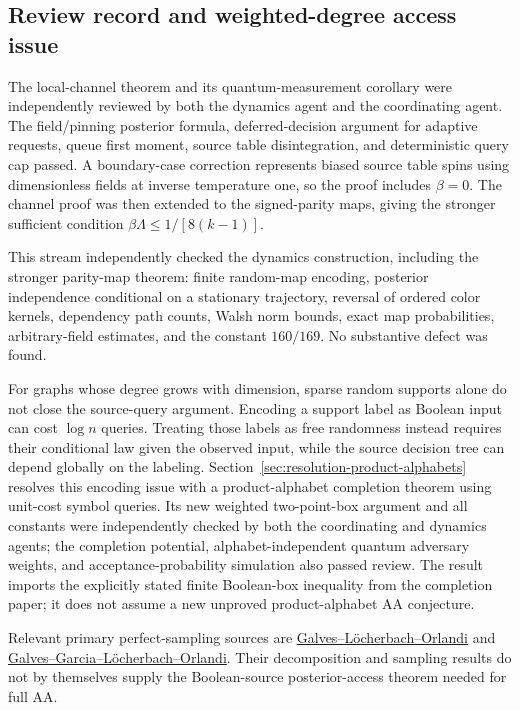\subsection{Review record and weighted-degree access issue}
\label{sec:resolution-structure-review}

The local-channel theorem and its quantum-measurement corollary were
independently reviewed by both the dynamics agent and the coordinating
agent. The field/pinning posterior formula, deferred-decision argument
for adaptive requests, queue first moment, source table disintegration,
and deterministic query cap passed. A boundary-case correction
represents biased source table spins using dimensionless fields at
inverse temperature one, so the proof includes \(\beta=0\).
The channel proof was then extended to the signed-parity maps, giving
the stronger sufficient condition \(\beta\Lambda\le1/[8(k-1)]\).

This stream independently checked the dynamics construction, including
the stronger parity-map theorem: finite random-map encoding, posterior
independence conditional on a stationary trajectory, reversal of ordered
color kernels, dependency path counts, Walsh norm bounds, exact map
probabilities, arbitrary-field estimates, and the constant \(160/169\).
No substantive defect was found.

For graphs whose degree grows with dimension, sparse random supports
alone do not close the source-query argument. Encoding a support label
as Boolean input can cost \(\log n\) queries. Treating those labels
as free randomness instead requires their conditional law given the
observed input, while the source decision tree can depend globally on
the labeling. Section~\ref{sec:resolution-product-alphabets} resolves
this encoding issue with a product-alphabet completion theorem using
unit-cost symbol queries. Its new weighted two-point-box argument and
all constants were independently checked by both the coordinating and
dynamics agents;
the completion potential, alphabet-independent quantum adversary
weights, and acceptance-probability simulation also passed review.
The result imports the explicitly stated finite Boolean-box inequality
from the completion paper; it does not assume a new unproved
product-alphabet AA conjecture.

Relevant primary perfect-sampling sources are
\href{https://arxiv.org/abs/0904.1845}{Galves--L\"ocherbach--Orlandi}
and
\href{https://arxiv.org/abs/1008.2740}{Galves--Garcia--L\"ocherbach--Orlandi}.
Their decomposition and sampling results do not by themselves supply
the Boolean-source posterior-access theorem needed for full AA.
